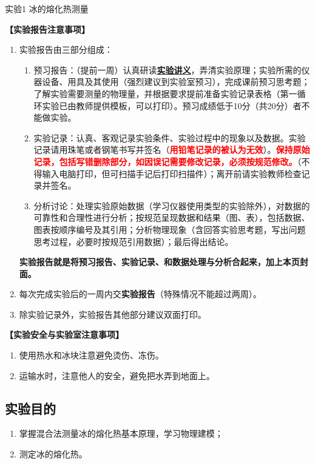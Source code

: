 \documentclass[dvipsnames, svgnames,a4paper,11pt]{article}
\begin{document}
\scoresTable{}{}{}{}{}{}{}{}

\infoTable{}{}{}{}{}{} %

\begin{center}
	\LARGE 实验1 \quad 冰的熔化热测量
\end{center}

\textbf{【实验报告注意事项】}
\begin{enumerate}
	\item 实验报告由三部分组成：
	\begin{enumerate}
		\item 预习报告：（提前一周）认真研读\underline{\textbf{实验讲义}}，弄清实验原理；实验所需的仪器设备、用具及其使用（强烈建议到实验室预习），完成课前预习思考题；了解实验需要测量的物理量，并根据要求提前准备实验记录表格（第一循环实验已由教师提供模板，可以打印）。预习成绩低于10分（共20分）者不能做实验。
	    \item 实验记录：认真、客观记录实验条件、实验过程中的现象以及数据。实验记录请用珠笔或者钢笔书写并签名（\textcolor{red}{\textbf{用铅笔记录的被认为无效}}）。\textcolor{red}{\textbf{保持原始记录，包括写错删除部分，如因误记需要修改记录，必须按规范修改。}}（不得输入电脑打印，但可扫描手记后打印扫描件）；离开前请实验教师检查记录并签名。
	    \item 分析讨论：处理实验原始数据（学习仪器使用类型的实验除外），对数据的可靠性和合理性进行分析；按规范呈现数据和结果（图、表），包括数据、图表按顺序编号及其引用；分析物理现象（含回答实验思考题，写出问题思考过程，必要时按规范引用数据）；最后得出结论。
	\end{enumerate}
	\textbf{实验报告就是将预习报告、实验记录、和数据处理与分析合起来，加上本页封面。}
	\item 每次完成实验后的一周内交\textbf{实验报告}（特殊情况不能超过两周）。
	\item 除实验记录外，实验报告其他部分建议双面打印。
\end{enumerate}

\textbf{【实验安全与实验室注意事项】}
\begin{enumerate}
	\item 使用热水和冰块注意避免烫伤、冻伤。
	\item 运输水时，注意他人的安全，避免把水弄到地面上。
\end{enumerate}

\clearpage

\setcounter{section}{0}
	
\subsection{实验目的}
\begin{enumerate}
	\item 掌握混合法测量冰的熔化热基本原理，学习物理建模；
	\item 测定冰的熔化热。
\end{enumerate}
\end{document}
